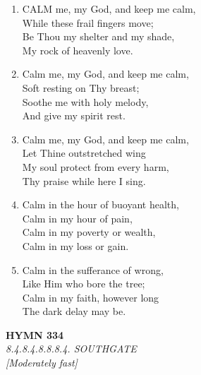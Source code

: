 \begin{enumerate}
    \item CALM me, my God, and keep me calm, \\
        While these frail fingers move; \\
        Be Thou my shelter and my shade, \\
        My rock of heavenly love.

    \item Calm me, my God, and keep me calm, \\
        Soft resting on Thy breast; \\
        Soothe me with holy melody, \\
        And give my spirit rest.

    \item Calm me, my God, and keep me calm, \\
        Let Thine outstretched wing \\
        My soul protect from every harm, \\
        Thy praise while here I sing.

    \item Calm in the hour of buoyant health, \\
        Calm in my hour of pain, \\
        Calm in my poverty or wealth, \\
        Calm in my loss or gain.

    \item Calm in the sufferance of wrong, \\
        Like Him who bore the tree; \\
        Calm in my faith, however long \\
        The dark delay may be.

\end{enumerate}

\newpage
\begin{center}
    {\Large \textbf{HYMN 334}}
    \\
    \textit{8.4.8.4.8.8.8.4. SOUTHGATE}
    \\
    \textit{\small [Moderately fast]}
\end{center}
\vspace{1em}

